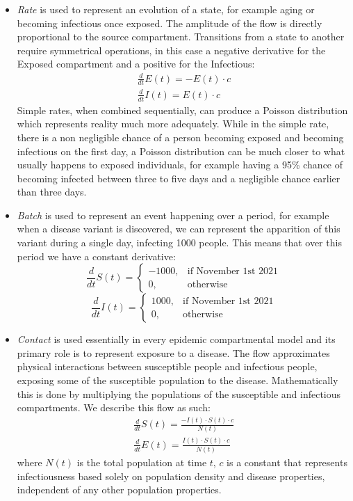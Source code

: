 \begin{itemize}
    \item \textit{Rate} is used to represent an evolution of a state, for example aging or becoming infectious once exposed. The amplitude of the flow is directly proportional to the source compartment. Transitions from a state to another require symmetrical operations, in this case a negative derivative for the Exposed compartment and a positive for the Infectious:
    \begin{gather*}
        \frac{d}{dt}E(t) = -E(t) \cdot c \\
        \frac{d}{dt}I(t) = E(t) \cdot c
    \end{gather*}
    Simple rates, when combined sequentially, can produce a Poisson distribution which represents reality much more adequately.
    While in the simple rate, there is a non negligible chance of a person becoming exposed and becoming infectious on the first day, a Poisson distribution can be much closer to what usually happens to exposed individuals, for example having a 95\% chance of becoming infected between three to five days and a negligible chance earlier than three days.
    
    \item \textit{Batch} is used to represent an event happening over a period, for example when a disease variant is discovered, we can represent the apparition of this variant during a single day, infecting 1000 people. This means that over this period we have a constant derivative:
    \[
        \frac{d}{dt}S(t)= 
        \begin{cases}
            -1000,& \text{if November 1st 2021}\\
            0,              & \text{otherwise}
        \end{cases}
    \]
    \[
        \frac{d}{dt}I(t)= 
        \begin{cases}
            1000,& \text{if November 1st 2021}\\
            0,              & \text{otherwise}
        \end{cases}
    \]
    \item \textit{Contact} is used essentially in every epidemic compartmental model and its primary role is to represent exposure to a disease. The flow approximates physical interactions between susceptible people and infectious people, exposing some of the susceptible population to the disease.
    Mathematically this is done by multiplying the populations of the susceptible and infectious compartments\cite{hamer1906epidemic, Bauch2008}.
    We describe this flow as such:
    \begin{gather*}
        \frac{d}{dt}S(t) = \frac{-I(t) \cdot S(t) \cdot c}{N(t)} \\
        \frac{d}{dt}E(t) = \frac{I(t) \cdot S(t) \cdot c}{N(t)}
    \end{gather*}
    where $N(t)$ is the total population at time $t$, $c$ is a constant that represents infectiousness based solely on population density and disease properties, independent of any other population properties.
\end{itemize}

